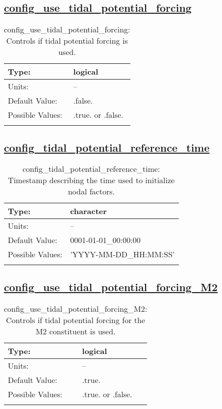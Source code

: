 \subsection[config\_use\_tidal\_potential\_forcing]{\hyperref[sec:nm_tab_tidal_potential_forcing]{config\_use\_tidal\_potential\_forcing}}
\label{subsec:nm_sec_config_use_tidal_potential_forcing}
\begin{center}
\begin{longtable}{| p{2.0in} || p{4.0in} |}
    \hline
    Type: & logical \\
    \hline
    Units: & -- \\
    \hline
    Default Value: & .false. \\
    \hline
    Possible Values: & .true. or .false. \\
    \hline
    \caption{config\_use\_tidal\_potential\_forcing: Controls if tidal potential forcing is used.}
\end{longtable}
\end{center}
\subsection[config\_tidal\_potential\_reference\_time]{\hyperref[sec:nm_tab_tidal_potential_forcing]{config\_tidal\_potential\_reference\_time}}
\label{subsec:nm_sec_config_tidal_potential_reference_time}
\begin{center}
\begin{longtable}{| p{2.0in} || p{4.0in} |}
    \hline
    Type: & character \\
    \hline
    Units: & -- \\
    \hline
    Default Value: & 0001-01-01\_00:00:00 \\
    \hline
    Possible Values: & 'YYYY-MM-DD\_HH:MM:SS' \\
    \hline
    \caption{config\_tidal\_potential\_reference\_time: Timestamp describing the time used to initialize nodal factors.}
\end{longtable}
\end{center}
\subsection[config\_use\_tidal\_potential\_forcing\_M2]{\hyperref[sec:nm_tab_tidal_potential_forcing]{config\_use\_tidal\_potential\_forcing\_M2}}
\label{subsec:nm_sec_config_use_tidal_potential_forcing_M2}
\begin{center}
\begin{longtable}{| p{2.0in} || p{4.0in} |}
    \hline
    Type: & logical \\
    \hline
    Units: & -- \\
    \hline
    Default Value: & .true. \\
    \hline
    Possible Values: & .true. or .false. \\
    \hline
    \caption{config\_use\_tidal\_potential\_forcing\_M2: Controls if tidal potential forcing for the M2 constituent is used.}
\end{longtable}
\end{center}

